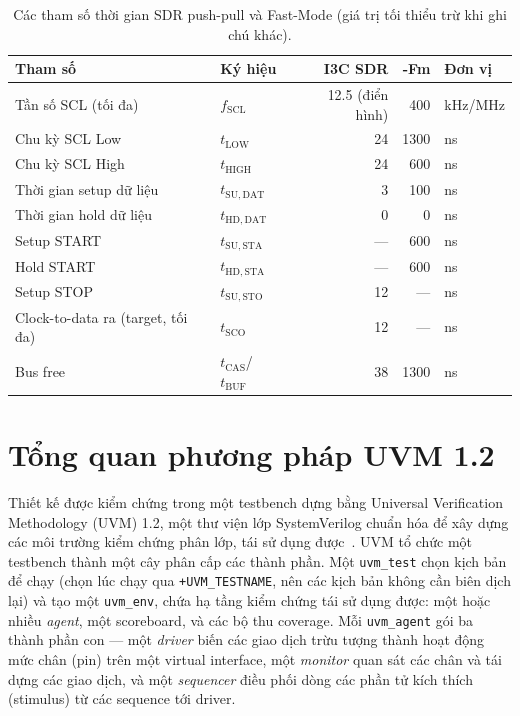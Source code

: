 \begin{table}[!htb]\centering
  \caption{Các tham số thời gian SDR push-pull và \iic{} Fast-Mode (giá trị tối thiểu trừ khi ghi chú khác).}
  \label{tab:timing-params}
  \small
  \begin{tabular}{@{}>{\raggedright\arraybackslash}p{} l r r l@{}}
    \toprule
    \textbf{Tham số} & \textbf{Ký hiệu} & \textbf{I3C SDR} & \textbf{\iic{}-Fm} & \textbf{Đơn vị} \\
    \midrule
    Tần số SCL (tối đa)            & $f_{\mathrm{SCL}}$  & 12.5 (điển hình) & 400  & \si{\kilo\hertz}/\si{\mega\hertz} \\
    Chu kỳ SCL Low                 & $t_{\mathrm{LOW}}$  & 24   & 1300 & \si{\nano\second} \\
    Chu kỳ SCL High                & $t_{\mathrm{HIGH}}$ & 24   & 600  & \si{\nano\second} \\
    Thời gian setup dữ liệu        & $t_{\mathrm{SU,DAT}}$ & 3  & 100  & \si{\nano\second} \\
    Thời gian hold dữ liệu         & $t_{\mathrm{HD,DAT}}$ & 0  & 0    & \si{\nano\second} \\
    Setup START                    & $t_{\mathrm{SU,STA}}$ & --- & 600 & \si{\nano\second} \\
    Hold START                     & $t_{\mathrm{HD,STA}}$ & --- & 600 & \si{\nano\second} \\
    Setup STOP                     & $t_{\mathrm{SU,STO}}$ & 12 & ---  & \si{\nano\second} \\
    Clock-to-data ra (target, tối đa)& $t_{\mathrm{SCO}}$  & 12   & ---  & \si{\nano\second} \\
    Bus free                       & $t_{\mathrm{CAS}}$/$t_{\mathrm{BUF}}$ & 38 & 1300 & \si{\nano\second} \\
    \bottomrule
  \end{tabular}
\end{table}

\section{Tổng quan phương pháp UVM 1.2}
\label{sec:bg-uvm}

Thiết kế được kiểm chứng trong một testbench dựng bằng Universal Verification Methodology (UVM)
1.2, một thư viện lớp SystemVerilog chuẩn hóa để xây dựng các môi trường kiểm chứng phân lớp,
tái sử dụng được~\cite{uvm12}. UVM tổ chức một testbench thành một cây phân cấp các thành phần.
Một \texttt{uvm\_test} chọn kịch bản để chạy (chọn lúc chạy qua \texttt{+UVM\_TESTNAME}, nên các
kịch bản không cần biên dịch lại) và tạo một \texttt{uvm\_env}, chứa hạ tầng kiểm chứng tái sử
dụng được: một hoặc nhiều \emph{agent}, một scoreboard, và các bộ thu coverage. Mỗi
\texttt{uvm\_agent} gói ba thành phần con --- một \emph{driver} biến các giao dịch trừu tượng
thành hoạt động mức chân (pin) trên một virtual interface, một \emph{monitor} quan sát các chân
và tái dựng các giao dịch, và một \emph{sequencer} điều phối dòng các phần tử kích thích
(stimulus) từ các sequence tới driver.

